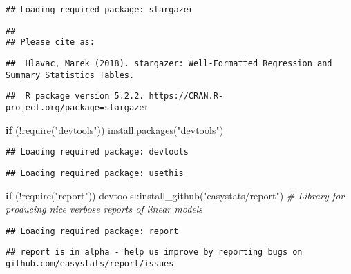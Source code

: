 \documentclass[
]{book}
\newenvironment{Shaded}{\begin{snugshade}}{\end{snugshade}}
\newcommand{\CommentTok}[1]{\textcolor[rgb]{0.56,0.35,0.01}{\textit{#1}}}
\newcommand{\ControlFlowTok}[1]{\textcolor[rgb]{0.13,0.29,0.53}{\textbf{#1}}}
\newcommand{\FunctionTok}[1]{\textcolor[rgb]{0.00,0.00,0.00}{#1}}
\newcommand{\NormalTok}[1]{#1}
\newcommand{\SpecialCharTok}[1]{\textcolor[rgb]{0.00,0.00,0.00}{#1}}
\newcommand{\StringTok}[1]{\textcolor[rgb]{0.31,0.60,0.02}{#1}}
\begin{document}
\begin{verbatim}
## Loading required package: stargazer
\end{verbatim}

\begin{verbatim}
## 
## Please cite as:
\end{verbatim}

\begin{verbatim}
##  Hlavac, Marek (2018). stargazer: Well-Formatted Regression and Summary Statistics Tables.
\end{verbatim}

\begin{verbatim}
##  R package version 5.2.2. https://CRAN.R-project.org/package=stargazer
\end{verbatim}

\begin{Shaded}
\begin{Highlighting}[]
\ControlFlowTok{if}\NormalTok{ (}\SpecialCharTok{!}\FunctionTok{require}\NormalTok{(}\StringTok{"devtools"}\NormalTok{)) }\FunctionTok{install.packages}\NormalTok{(}\StringTok{"devtools"}\NormalTok{)}
\end{Highlighting}
\end{Shaded}

\begin{verbatim}
## Loading required package: devtools
\end{verbatim}

\begin{verbatim}
## Loading required package: usethis
\end{verbatim}

\begin{Shaded}
\begin{Highlighting}[]
\ControlFlowTok{if}\NormalTok{ (}\SpecialCharTok{!}\FunctionTok{require}\NormalTok{(}\StringTok{"report"}\NormalTok{)) devtools}\SpecialCharTok{::}\FunctionTok{install\_github}\NormalTok{(}\StringTok{"easystats/report"}\NormalTok{) }\CommentTok{\# Library for producing nice verbose reports of linear models}
\end{Highlighting}
\end{Shaded}

\begin{verbatim}
## Loading required package: report
\end{verbatim}

\begin{verbatim}
## report is in alpha - help us improve by reporting bugs on github.com/easystats/report/issues
\end{verbatim}
\end{document}

